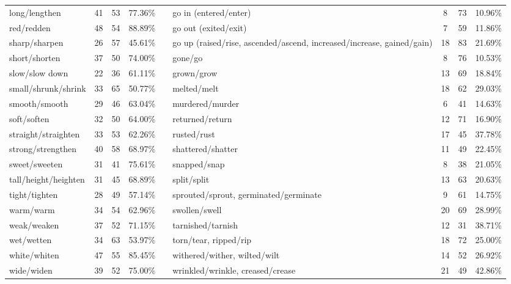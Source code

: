 \begin{tabular}{p{3cm}ccccp{3cm}ccc}
long/lengthen & 41 & 53 & 77.36\% & & go in (entered/enter) & 8 & 73 & 10.96\% \\
red/redden & 48 & 54 & 88.89\% & & go out (exited/exit) & 7 & 59 & 11.86\% \\
sharp/sharpen & 26 & 57 & 45.61\% & & go up (raised/rise, ascended/ascend, increased/increase, gained/gain) & 18 & 83 & 21.69\% \\
short/shorten & 37 & 50 & 74.00\% & & gone/go & 8 & 76 & 10.53\% \\
slow/slow down & 22 & 36 & 61.11\% & & grown/grow & 13 & 69 & 18.84\% \\
small/shrunk/shrink & 33 & 65 & 50.77\% & & melted/melt & 18 & 62 & 29.03\% \\
smooth/smooth & 29 & 46 & 63.04\% & & murdered/murder & 6 & 41 & 14.63\% \\
soft/soften & 32 & 50 & 64.00\% & & returned/return & 12 & 71 & 16.90\% \\
straight/straighten & 33 & 53 & 62.26\% & & rusted/rust & 17 & 45 & 37.78\% \\
strong/strengthen & 40 & 58 & 68.97\% & & shattered/shatter & 11 & 49 & 22.45\% \\
sweet/sweeten & 31 & 41 & 75.61\% & & snapped/snap & 8 & 38 & 21.05\% \\
tall/height/heighten & 31 & 45 & 68.89\% & & split/split & 13 & 63 & 20.63\% \\
tight/tighten & 28 & 49 & 57.14\% & & sprouted/sprout, germinated/germinate & 9 & 61 & 14.75\% \\
warm/warm & 34 & 54 & 62.96\% & & swollen/swell & 20 & 69 & 28.99\% \\
weak/weaken & 37 & 52 & 71.15\% & & tarnished/tarnish & 12 & 31 & 38.71\% \\
wet/wetten & 34 & 63 & 53.97\% & & torn/tear, ripped/rip & 18 & 72 & 25.00\% \\
white/whiten & 47 & 55 & 85.45\% & & withered/wither, wilted/wilt & 14 & 52 & 26.92\% \\
wide/widen & 39 & 52 & 75.00\% & & wrinkled/wrinkle, creased/crease & 21 & 49 & 42.86\%
\end{tabular}